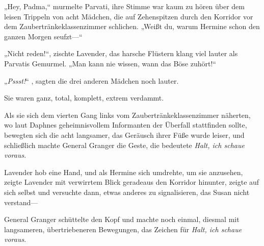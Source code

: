 „Hey, Padma,“ murmelte Parvati, ihre Stimme war kaum zu hören über dem leisen Trippeln von acht Mädchen, die auf Zehenspitzen durch den Korridor vor dem Zaubertränkeklassenzimmer schlichen. „Weißt du, warum Hermine schon den ganzen Morgen seufzt—“

„Nicht reden!“, zischte Lavender, das harsche Flüstern klang viel lauter als Parvatis Gemurmel. „Man kann nie wissen, wann das Böse zuhört!“

„\emph{Pssst!}“ , sagten die drei anderen Mädchen noch lauter.

Sie waren ganz, total, komplett, extrem verdammt.

Als sie sich dem vierten Gang links vom Zaubertränkeklassenzimmer näherten, wo laut Daphnes geheimnisvollem Informanten der Überfall stattfinden sollte, bewegten sich die acht langsamer, das Geräusch ihrer Füße wurde leiser, und schließlich machte General Granger die Geste, die bedeutete \emph{Halt, ich schaue voraus}.

Lavender hob eine Hand, und als Hermine sich umdrehte, um sie anzusehen, zeigte Lavender mit verwirrtem Blick geradeaus den Korridor hinunter, zeigte auf sich selbst und versuchte dann, etwas anderes zu signalisieren, das Susan nicht verstand—

General Granger schüttelte den Kopf und machte noch einmal, diesmal mit langsameren, übertriebeneren Bewegungen, das Zeichen für \emph{Halt, ich schaue voraus}.

